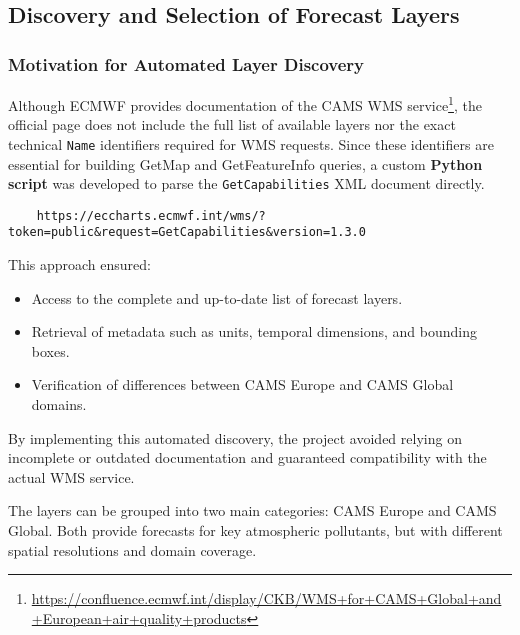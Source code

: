 \subsection{Discovery and Selection of Forecast Layers}

\subsubsection{Motivation for Automated Layer Discovery}
Although ECMWF provides documentation of the CAMS WMS service\footnote{\url{https://confluence.ecmwf.int/display/CKB/WMS+for+CAMS+Global+and+European+air+quality+products}}, 
the official page does not include the full list of available layers nor the exact technical \texttt{Name} identifiers required for WMS requests. 
Since these identifiers are essential for building GetMap and GetFeatureInfo queries, a custom \textbf{Python script} was developed to parse the \texttt{GetCapabilities} XML document directly. 

\begin{verbatim}
	https://eccharts.ecmwf.int/wms/?token=public&request=GetCapabilities&version=1.3.0
\end{verbatim}

This approach ensured:
\begin{itemize}
	\item Access to the complete and up-to-date list of forecast layers.
	\item Retrieval of metadata such as units, temporal dimensions, and bounding boxes.
	\item Verification of differences between CAMS Europe and CAMS Global domains.
\end{itemize}

By implementing this automated discovery, the project avoided relying on incomplete or outdated documentation and guaranteed compatibility with the actual WMS service.  

The layers can be grouped into two main categories: CAMS Europe and CAMS Global. Both provide forecasts for key atmospheric pollutants, but with different spatial resolutions and domain coverage.


